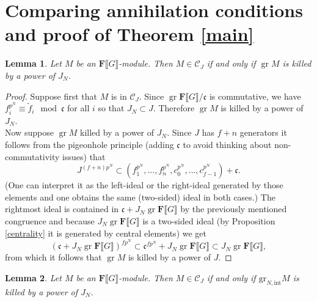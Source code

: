 \documentclass[11pt, oneside]{article}
\newcommand{\grint}{\text{gr}_{N,\text{int}}}
\DeclareMathOperator{\gr}{gr}
\newtheorem{lemma}{Lemma}
\theoremstyle{definition}
\begin{document}
	\section{Comparing annihilation conditions and proof of Theorem \ref{main}}
	\begin{lemma}
		Let $M$ be an $\mathbf F\llbracket G\rrbracket$-module. Then $M\in\mathcal C_J$ if and only if $\gr M$ is killed by a power of $J_N$.
	\end{lemma}
	\begin{proof}
		Suppose first that $M$ is in $\mathcal C_J$. Since $\gr\mathbf F\llbracket G\rrbracket/\mathfrak c$ is commutative, we have $f_i^{p^N}\equiv\tilde f_i\mod\mathfrak c$ for all $i$ so that $J_N\subset J$. Therefore $\gr M$ is killed by a power of $J_N$.\\
		Now suppose $\gr M$ killed by a power of $J_N$. Since $J$ has $f+n$ generators it follows from the pigeonhole principle (adding $\mathfrak c$ to avoid thinking about non-commutativity issues) that $$J^{(f+n)p^N}\subset (f_1^{p^N},\dots,f_n^{p^N},c_0^{p^N},\dots,c_{f-1}^{p^N})+\mathfrak c.$$ (One can interpret it as the left-ideal or the right-ideal generated by those elements and one obtains the same (two-sided) ideal in both cases.)
		The rightmost ideal is contained in $\mathfrak c+J_N\gr\mathbf F\llbracket G\rrbracket$ by the previously mentioned congruence and because $J_N\gr\mathbf F\llbracket G\rrbracket$ is a two-sided ideal (by Proposition \ref{centrality} it is generated by central elements) we get  $$\left(\mathfrak c+J_N\gr\mathbf F\llbracket G\rrbracket\right)^{fp^N}\subset\mathfrak c^{fp^N}+J_N\gr\mathbf F\llbracket G\rrbracket\subset J_N\gr\mathbf F\llbracket G\rrbracket,$$ from which it follows that $\gr M$ is killed by a power of $J$.
	\end{proof}
	\begin{lemma}\label{anotation}
		Let $M$ be an $\mathbf F\llbracket G\rrbracket$-module. Then $M\in\mathcal C_J$ if and only if $\grint M$ is killed by a power of $J_N$.
	\end{lemma}
\end{document}
